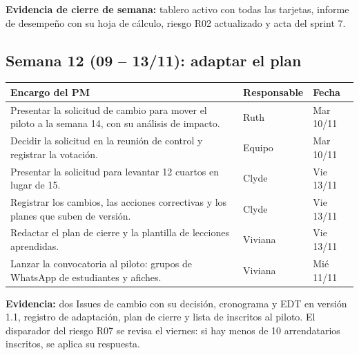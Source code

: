 \documentclass[11pt,a4paper]{article}
\begin{document}
\vspace{0.1cm}
\noindent\textbf{Evidencia de cierre de semana:} tablero activo con todas las tarjetas, informe de desempeño con su hoja de cálculo, riesgo R02 actualizado y acta del sprint 7.

\subsection{Semana 12 (09 -- 13/11): adaptar el plan}
{\small
{}
\noindent\begin{tabularx}{\textwidth}{@{}L P{2.7cm} C{1.6cm}@{}}
\toprule
{}
\textbf{Encargo del PM} & \textbf{Responsable} & \textbf{Fecha} \\
\midrule
Presentar la solicitud de cambio para mover el piloto a la semana 14, con su análisis de impacto. & Ruth & Mar 10/11 \\
Decidir la solicitud en la reunión de control y registrar la votación. & Equipo & Mar 10/11 \\
Presentar la solicitud para levantar 12 cuartos en lugar de 15. & Clyde & Vie 13/11 \\
Registrar los cambios, las acciones correctivas y los planes que suben de versión. & Clyde & Vie 13/11 \\
Redactar el plan de cierre y la plantilla de lecciones aprendidas. & Viviana & Vie 13/11 \\
Lanzar la convocatoria al piloto: grupos de WhatsApp de estudiantes y afiches. & Viviana & Mié 11/11 \\
\bottomrule
\end{tabularx}
}

\vspace{0.1cm}
\noindent\textbf{Evidencia:} dos Issues de cambio con su decisión, cronograma y EDT en versión 1.1, registro de adaptación, plan de cierre y lista de inscritos al piloto. El disparador del riesgo R07 se revisa el viernes: si hay menos de 10 arrendatarios inscritos, se aplica su respuesta.

\end{document}
